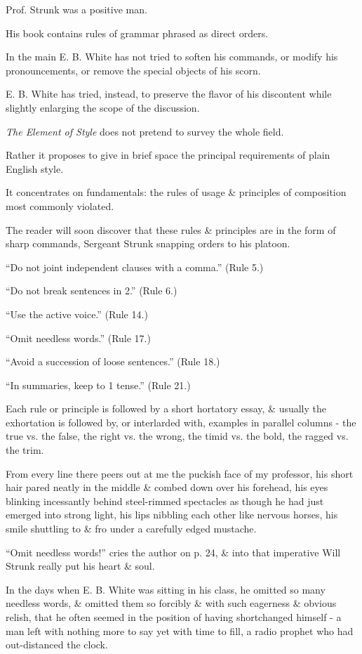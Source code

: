 \documentclass{article}
\begin{document}
%
Prof. Strunk was a positive man.

His book contains rules of grammar phrased as direct orders.

In the main E. B. White has not tried to soften his commands, or modify his pronouncements, or remove the special objects of his scorn.

E. B. White has tried, instead, to preserve the flavor of his discontent while slightly enlarging the scope of the discussion.

{\it The Element of Style} does not pretend to survey the whole field.

Rather it proposes to give in brief space the principal requirements of plain English style.

It concentrates on fundamentals: the rules of usage \& principles of composition most commonly violated.

%
The reader will soon discover that these rules \& principles are in the form of sharp commands, Sergeant Strunk snapping orders to his platoon.

``Do not joint independent clauses with a comma.'' (Rule 5.)

``Do not break sentences in 2.'' (Rule 6.)

``Use the active voice.'' (Rule 14.)

``Omit needless words.'' (Rule 17.)

``Avoid a succession of loose sentences.'' (Rule 18.)

``In summaries, keep to 1 tense.'' (Rule 21.)

Each rule or principle is followed by a short hortatory essay, \& usually the exhortation is followed by, or interlarded with, examples in parallel columns - the true vs. the false, the right vs. the wrong, the timid vs. the bold, the ragged vs. the trim.

From every line there peers out at me the puckish face of my professor, his short hair pared neatly in the middle \& combed down over his forehead, his eyes blinking incessantly behind steel-rimmed spectacles as though he had just emerged into strong light, his lips nibbling each other like nervous horses, his smile shuttling to \& fro under a carefully edged mustache.

%
``Omit needless words!'' cries the author on p. 24, \& into that imperative Will Strunk really put his heart \& soul.

In the days when E. B. White was sitting in his class, he omitted so many needless words, \& omitted them so forcibly \& with such eagerness \& obvious relish, that he often seemed in the position of having shortchanged himself - a man left with nothing more to say yet with time to fill, a radio prophet who had out-distanced the clock.
\end{document}
